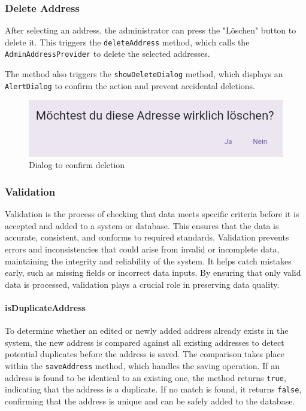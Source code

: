\subsubsection{Delete Address}
After selecting an address, the administrator can press the "Löschen" button to delete it. This triggers the \texttt{deleteAddress} method, which calls the \texttt{AdminAddressProvider} to delete the selected addresses.\blankLine

The method also triggers the \texttt{showDeleteDialog} method, which displays an \texttt{AlertDialog} to confirm the action and prevent accidental deletions.

\begin{figure}[H]
    \centering
    \includegraphics[width=0.6\linewidth]{images/AdminPanel/DeleteDialog.png}
    \caption{Dialog to confirm deletion}
\end{figure}

\subsubsection{Validation}
\label{fig:Validation}
    Validation is the process of checking that data meets specific criteria before it is accepted and added to a system or database. This ensures that the data is accurate, consistent, and conforms to required standards. Validation prevents errors and inconsistencies that could arise from invalid or incomplete data, maintaining the integrity and reliability of the system. It helps catch mistakes early, such as missing fields or incorrect data inputs. By ensuring that only valid data is processed, validation plays a crucial role in preserving data quality. \autocite{ContributorstoWikimediaprojects2025Feb}

\paragraph{isDuplicateAddress}
    To determine whether an edited or newly added address already exists in the system, the new address is compared against all existing addresses to detect potential duplicates before the address is saved. The comparison takes place within the \texttt{saveAddress} method, which handles the saving operation. If an address is found to be identical to an existing one, the method returns \texttt{true}, indicating that the address is a duplicate. If no match is found, it returns \texttt{false}, confirming that the address is unique and can be safely added to the database.


